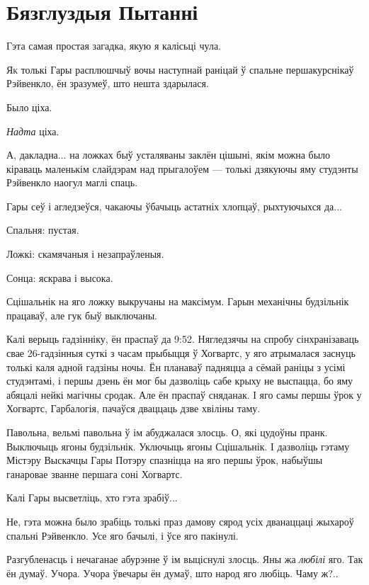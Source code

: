 \chapter{Бязглуздыя Пытанні}


\begin{chapterOpeningQuote}
Гэта самая простая загадка, якую я калісьці чула.
\end{chapterOpeningQuote}

\lettrine{Я}{к} толькі Гары расплюшчыў вочы наступнай раніцай 
ў спальне першакурснікаў Рэйвенкло, ён зразумеў, што нешта здарылася.

Было ціха.

\emph{Надта} ціха.

А, дакладна... на ложках быў усталяваны заклён цішыні, якім можна было кіраваць 
маленькім слайдэрам над прыгалоўем --- толькі дзякуючы яму студэнты Рэйвенкло наогул маглі 
спаць.

Гары сеў і агледзеўся, чакаючы ўбачыць астатніх хлопцаў, рыхтуючыхся да...

Спальня: пустая.

Ложкі: скамячаныя і незапраўленыя.

Сонца: яскрава і высока.

Сцішальнік на яго ложку выкручаны на максімум. Гарын механічны будзільнік працаваў,
але гук быў выключаны.

Калі верыць гадзінніку, ён праспаў да 9:52. Нягледзячы на спробу сінхранізаваць 
свае 26-гадзінныя суткі з часам прыбыцця ў Хогвартс, у яго атрымалася заснуць 
толькі каля адной гадзіны ночы. Ён планаваў падняцца а сёмай раніцы з усімі 
студэнтамі, і першы дзень ён мог бы дазволіць сабе крыху не выспацца, бо яму
абяцалі нейкі магічны сродак. Але ён праспаў сняданак. І яго самы першы
ўрок у Хогвартс, Гарбалогія, пачаўся дваццаць дзве хвіліны таму.

Павольна, вельмі павольна ў ім абуджалася злосць. О, які цудоўны пранк. 
Выключыць ягоны будзільнік. Уключыць ягоны Сцішальнік. І дазволіць гэтаму 
Містэру Выскачцы Гары Потэру спазніцца на яго першы ўрок, набыўшы ганаровае 
званне першага соні Хогвартс. 

Калі Гары высветліць, хто гэта зрабіў...

Не, гэта можна было зрабіць толькі праз дамову сярод усіх дванаццаці 
жыхароў спальні Рэйвенкло. Усе яго бачылі, і ўсе яго пакінулі.

Разгубленасць і нечаганае абурэнне ў ім выціснулі злосць. Яны жа \emph{любілі} яго.
Так ён думаў. Учора. Учора ўвечары ён думаў, што народ яго любіць. Чаму ж?..

